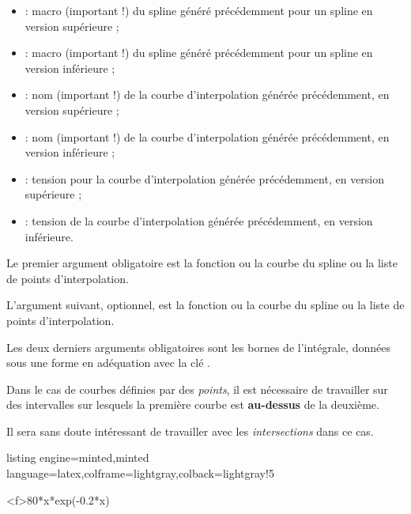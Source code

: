 \documentclass[11pt,a4paper]{ltxdoc}
\begin{document}
\begin{itemize}
	\item {} : macro (important !) du spline généré précédemment pour un spline en version supérieure ;
	\item {} : macro (important !) du spline généré précédemment pour un spline en version inférieure ;
	\item {} : nom (important !) de la courbe d'interpolation générée précédemment, en version supérieure ;
	\item {} : nom (important !) de la courbe d'interpolation générée précédemment, en version inférieure ;
	\item {} : tension pour la courbe d'interpolation générée précédemment, en version supérieure ;
	\item {} : tension de la courbe d'interpolation générée précédemment, en version inférieure.
\end{itemize}

\smallskip

Le premier argument obligatoire est la fonction ou la courbe du spline ou la liste de points d'interpolation.

\smallskip

L'argument suivant, optionnel, est la fonction ou la courbe du spline ou la liste de points d'interpolation.

\smallskip

Les deux derniers arguments obligatoires sont les bornes de l'intégrale, données sous une forme en adéquation avec la clé .

\pagebreak

Dans le cas de courbes définies par des \textit{points}, il est nécessaire de travailler sur des intervalles sur lesquels la première courbe est \textbf{au-dessus} de la deuxième.

Il sera sans doute intéressant de travailler avec les \textit{intersections} dans ce cas.

\begin{tcblisting}{listing engine=minted,minted language=latex,colframe=lightgray,colback=lightgray!5}
\begin{GraphiqueTikz}%
	[x=0.6cm,y=0.06cm,
	Xmin=0,Xmax=21,Xgrille=1,Xgrilles=0.5,
	Ymin=0,Ymax=155,Ygrille=10,Ygrilles=5]
	\TracerAxesGrilles%
		[Grads=false,Elargir=2.5mm]{}{}
	{80*x*exp(-0.2*x)}
\end{GraphiqueTikz}
\end{tcblisting}
\end{document}
